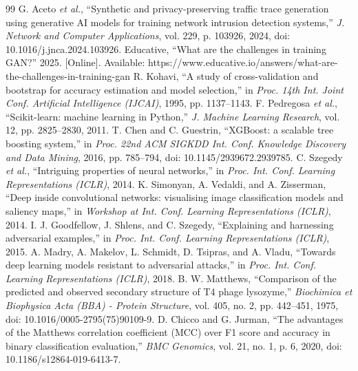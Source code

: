 \documentclass{iaesarticle}
\begin{document}
\begin{thebibliography}{99}
 G. Aceto \textsl{et al.}, ``Synthetic and privacy-preserving traffic trace generation using generative AI models for training network intrusion detection systems,'' \textsl{J. Network and Computer Applications}, vol. 229, p. 103926, 2024, doi: 10.1016/j.jnca.2024.103926.
 Educative, ``What are the challenges in training GAN?'' 2025. [Online]. Available: https://www.educative.io/answers/what-are-the-challenges-in-training-gan
 R. Kohavi, ``A study of cross-validation and bootstrap for accuracy estimation and model selection,'' in \textsl{Proc. 14th Int. Joint Conf. Artificial Intelligence (IJCAI)}, 1995, pp. 1137--1143.
 F. Pedregosa \textsl{et al.}, ``Scikit-learn: machine learning in Python,'' \textsl{J. Machine Learning Research}, vol. 12, pp. 2825--2830, 2011.
 T. Chen and C. Guestrin, ``XGBoost: a scalable tree boosting system,'' in \textsl{Proc. 22nd ACM SIGKDD Int. Conf. Knowledge Discovery and Data Mining}, 2016, pp. 785--794, doi: 10.1145/2939672.2939785.
 C. Szegedy \textsl{et al.}, ``Intriguing properties of neural networks,'' in \textsl{Proc. Int. Conf. Learning Representations (ICLR)}, 2014.
 K. Simonyan, A. Vedaldi, and A. Zisserman, ``Deep inside convolutional networks: visualising image classification models and saliency maps,'' in \textsl{Workshop at Int. Conf. Learning Representations (ICLR)}, 2014.
 I. J. Goodfellow, J. Shlens, and C. Szegedy, ``Explaining and harnessing adversarial examples,'' in \textsl{Proc. Int. Conf. Learning Representations (ICLR)}, 2015.
 A. Madry, A. Makelov, L. Schmidt, D. Tsipras, and A. Vladu, ``Towards deep learning models resistant to adversarial attacks,'' in \textsl{Proc. Int. Conf. Learning Representations (ICLR)}, 2018.
 B. W. Matthews, ``Comparison of the predicted and observed secondary structure of T4 phage lysozyme,'' \textsl{Biochimica et Biophysica Acta (BBA) - Protein Structure}, vol. 405, no. 2, pp. 442--451, 1975, doi: 10.1016/0005-2795(75)90109-9.
 D. Chicco and G. Jurman, ``The advantages of the Matthews correlation coefficient (MCC) over F1 score and accuracy in binary classification evaluation,'' \textsl{BMC Genomics}, vol. 21, no. 1, p. 6, 2020, doi: 10.1186/s12864-019-6413-7.

\end{thebibliography}
\end{document}
